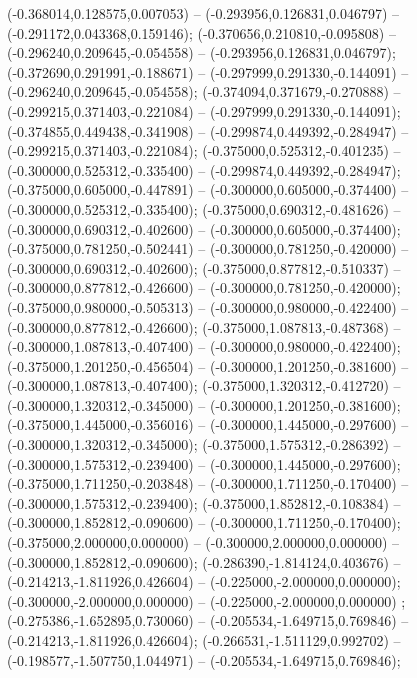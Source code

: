  (-0.368014,0.128575,0.007053) -- (-0.293956,0.126831,0.046797) -- (-0.291172,0.043368,0.159146);
 (-0.370656,0.210810,-0.095808) -- (-0.296240,0.209645,-0.054558) -- (-0.293956,0.126831,0.046797);
 (-0.372690,0.291991,-0.188671) -- (-0.297999,0.291330,-0.144091) -- (-0.296240,0.209645,-0.054558);
 (-0.374094,0.371679,-0.270888) -- (-0.299215,0.371403,-0.221084) -- (-0.297999,0.291330,-0.144091);
 (-0.374855,0.449438,-0.341908) -- (-0.299874,0.449392,-0.284947) -- (-0.299215,0.371403,-0.221084);
 (-0.375000,0.525312,-0.401235) -- (-0.300000,0.525312,-0.335400) -- (-0.299874,0.449392,-0.284947);
 (-0.375000,0.605000,-0.447891) -- (-0.300000,0.605000,-0.374400) -- (-0.300000,0.525312,-0.335400);
 (-0.375000,0.690312,-0.481626) -- (-0.300000,0.690312,-0.402600) -- (-0.300000,0.605000,-0.374400);
 (-0.375000,0.781250,-0.502441) -- (-0.300000,0.781250,-0.420000) -- (-0.300000,0.690312,-0.402600);
 (-0.375000,0.877812,-0.510337) -- (-0.300000,0.877812,-0.426600) -- (-0.300000,0.781250,-0.420000);
 (-0.375000,0.980000,-0.505313) -- (-0.300000,0.980000,-0.422400) -- (-0.300000,0.877812,-0.426600);
 (-0.375000,1.087813,-0.487368) -- (-0.300000,1.087813,-0.407400) -- (-0.300000,0.980000,-0.422400);
 (-0.375000,1.201250,-0.456504) -- (-0.300000,1.201250,-0.381600) -- (-0.300000,1.087813,-0.407400);
 (-0.375000,1.320312,-0.412720) -- (-0.300000,1.320312,-0.345000) -- (-0.300000,1.201250,-0.381600);
 (-0.375000,1.445000,-0.356016) -- (-0.300000,1.445000,-0.297600) -- (-0.300000,1.320312,-0.345000);
 (-0.375000,1.575312,-0.286392) -- (-0.300000,1.575312,-0.239400) -- (-0.300000,1.445000,-0.297600);
 (-0.375000,1.711250,-0.203848) -- (-0.300000,1.711250,-0.170400) -- (-0.300000,1.575312,-0.239400);
 (-0.375000,1.852812,-0.108384) -- (-0.300000,1.852812,-0.090600) -- (-0.300000,1.711250,-0.170400);
 (-0.375000,2.000000,0.000000) -- (-0.300000,2.000000,0.000000) -- (-0.300000,1.852812,-0.090600);
 (-0.286390,-1.814124,0.403676) -- (-0.214213,-1.811926,0.426604) -- (-0.225000,-2.000000,0.000000);
 (-0.300000,-2.000000,0.000000) -- (-0.225000,-2.000000,0.000000) ;
 (-0.275386,-1.652895,0.730060) -- (-0.205534,-1.649715,0.769846) -- (-0.214213,-1.811926,0.426604);
 (-0.266531,-1.511129,0.992702) -- (-0.198577,-1.507750,1.044971) -- (-0.205534,-1.649715,0.769846);
